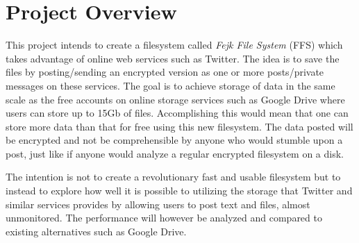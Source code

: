 \section{Project Overview}

This project intends to create a filesystem called \textit{Fejk File System} (FFS) which takes advantage of online web services such as Twitter. The idea is to save the files by posting/sending an encrypted version as one or more posts/private messages on these services. The goal is to achieve storage of data in the same scale as the free accounts on online storage services such as Google Drive where users can store up to 15Gb of files. Accomplishing this would mean that one can store more data than that for free using this new filesystem. The data posted will be encrypted and not be comprehensible by anyone who would stumble upon a post, just like if anyone would analyze a regular encrypted filesystem on a disk. 

The intention is not to create a revolutionary fast and usable filesystem but to instead to explore how well it is possible to utilizing the storage that Twitter and similar services provides by allowing users to post text and files, almost unmonitored. The performance will however be analyzed and compared to existing alternatives such as Google Drive.
